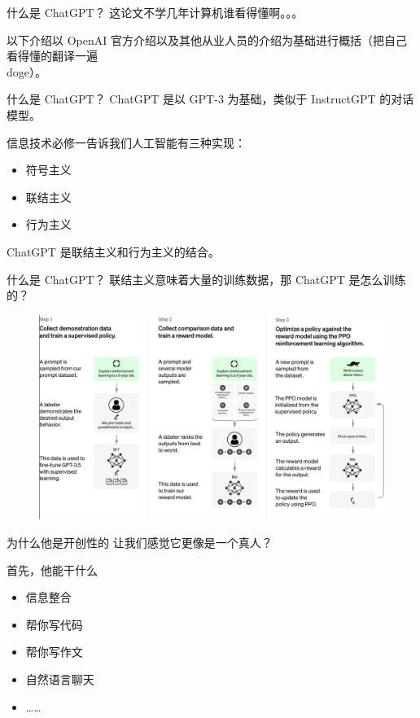 \documentclass{beamer}
\begin{document}
  \maketitle
  \begin{frame}{什么是 ChatGPT？}
    这论文不学几年计算机谁看得懂啊。。。

    以下介绍以 OpenAI 官方介绍以及其他从业人员的介绍为基础进行概括（把自己看得懂的翻译一遍 \\doge）。
  \end{frame}
  \begin{frame}{什么是 ChatGPT？}
    ChatGPT 是以 GPT-3 为基础，类似于 InstructGPT 的对话模型。

    信息技术必修一告诉我们人工智能有三种实现：
    \begin{itemize}
      \item 符号主义
      \item 联结主义
      \item 行为主义
    \end{itemize}

    ChatGPT 是联结主义和行为主义的结合。
  \end{frame}
  \begin{frame}{什么是 ChatGPT？}
    联结主义意味着大量的训练数据，那 ChatGPT 是怎么训练的？
    \pause

    \begin{figure}[h]
      \includegraphics[scale=0.3]{ChatGPT_Diagram.jpg}
    \end{figure}
  \end{frame}
  \begin{frame}{为什么他是开创性的}
    让我们感觉它更像是一个真人？
  \end{frame}
  \begin{frame}{首先，他能干什么}
    \begin{itemize}
      \item 信息整合
      \item 帮你写代码
      \item 帮你写作文
      \item 自然语言聊天
      \item ……
    \end{itemize}
  \end{frame}
\end{document}
